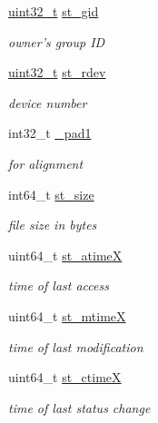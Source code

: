\begin{DoxyCompactItemize}
\hyperlink{Type_8hh_a435d1572bf3f880d55459d9805097f62}{uint32\_\-t} \hyperlink{structLinux_1_1tgt__stat_a1faa6012541b83fd5218e2b229f876ec}{st\_\-gid}
\begin{DoxyCompactList}\small\item\em owner's group ID \item\end{DoxyCompactList}\item 
\hyperlink{Type_8hh_a435d1572bf3f880d55459d9805097f62}{uint32\_\-t} \hyperlink{structLinux_1_1tgt__stat_ac4a67c3d290b4f93d0d91b99776f4207}{st\_\-rdev}
\begin{DoxyCompactList}\small\item\em device number \item\end{DoxyCompactList}\item 
int32\_\-t \hyperlink{structLinux_1_1tgt__stat_a902f52ddee3e9cb51a33fb353723d79e}{\_\-pad1}
\begin{DoxyCompactList}\small\item\em for alignment \item\end{DoxyCompactList}\item 
int64\_\-t \hyperlink{structLinux_1_1tgt__stat_aec608d79c93ed6d010aec9f7487e0064}{st\_\-size}
\begin{DoxyCompactList}\small\item\em file size in bytes \item\end{DoxyCompactList}\item 
uint64\_\-t \hyperlink{structLinux_1_1tgt__stat_a6602fcfc6e3137ac04ca7a50efbc3d34}{st\_\-atimeX}
\begin{DoxyCompactList}\small\item\em time of last access \item\end{DoxyCompactList}\item 
uint64\_\-t \hyperlink{structLinux_1_1tgt__stat_ab8b373ea7421a08973572a52f534c7f7}{st\_\-mtimeX}
\begin{DoxyCompactList}\small\item\em time of last modification \item\end{DoxyCompactList}\item 
uint64\_\-t \hyperlink{structLinux_1_1tgt__stat_a00568e9305d84f1177fcf07f6a5e28e4}{st\_\-ctimeX}
\begin{DoxyCompactList}\small\item\em time of last status change \item\end{DoxyCompactList}\item 

\end{DoxyCompactItemize}

